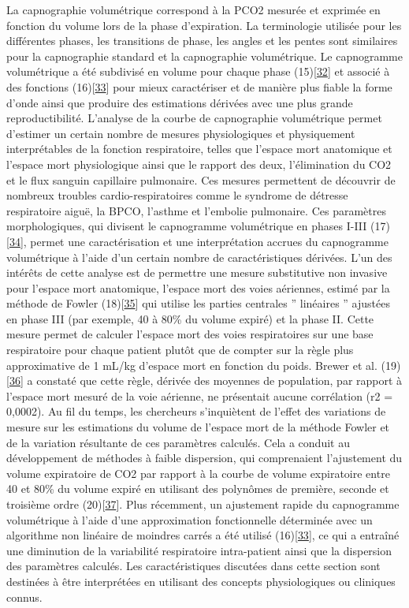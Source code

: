 \documentclass[12pt,]{article}
\begin{document}
La capnographie volumétrique correspond à la PCO2 mesurée et exprimée en
fonction du volume lors de la phase d'expiration. La terminologie
utilisée pour les différentes phases, les transitions de phase, les
angles et les pentes sont similaires pour la capnographie standard et la
capnographie volumétrique. Le capnogramme volumétrique a été subdivisé
en volume pour chaque phase
(15){[}\protect\hyperlink{ref-rayburn1994neural}{32}{]} et associé à des
fonctions (16){[}\protect\hyperlink{ref-tusman2011capnography}{33}{]}
pour mieux caractériser et de manière plus fiable la forme d'onde ainsi
que produire des estimations dérivées avec une plus grande
reproductibilité. L'analyse de la courbe de capnographie volumétrique
permet d'estimer un certain nombre de mesures physiologiques et
physiquement interprétables de la fonction respiratoire, telles que
l'espace mort anatomique et l'espace mort physiologique ainsi que le
rapport des deux, l'élimination du CO2 et le flux sanguin capillaire
pulmonaire. Ces mesures permettent de découvrir de nombreux troubles
cardio-respiratoires comme le syndrome de détresse respiratoire aiguë,
la BPCO, l'asthme et l'embolie pulmonaire. Ces paramètres
morphologiques, qui divisent le capnogramme volumétrique en phases I-III
(17){[}\protect\hyperlink{ref-fletcher1981concept}{34}{]}, permet une
caractérisation et une interprétation accrues du capnogramme
volumétrique à l'aide d'un certain nombre de caractéristiques dérivées.
L'un des intérêts de cette analyse est de permettre une mesure
substitutive non invasive pour l'espace mort anatomique, l'espace mort
des voies aériennes, estimé par la méthode de Fowler
(18){[}\protect\hyperlink{ref-fowler1948lung}{35}{]} qui utilise les
parties centrales '' linéaires '' ajustées en phase III (par exemple, 40
à 80\% du volume expiré) et la phase II. Cette mesure permet de calculer
l'espace mort des voies respiratoires sur une base respiratoire pour
chaque patient plutôt que de compter sur la règle plus approximative de
1 mL/kg d'espace mort en fonction du poids. Brewer et al.
(19){[}\protect\hyperlink{ref-brewer2008anatomic}{36}{]} a constaté que
cette règle, dérivée des moyennes de population, par rapport à l'espace
mort mesuré de la voie aérienne, ne présentait aucune corrélation (r2 =
0,0002). Au fil du temps, les chercheurs s'inquiètent de l'effet des
variations de mesure sur les estimations du volume de l'espace mort de
la méthode Fowler et de la variation résultante de ces paramètres
calculés. Cela a conduit au développement de méthodes à faible
dispersion, qui comprenaient l'ajustement du volume expiratoire de CO2
par rapport à la courbe de volume expiratoire entre 40 et 80\% du volume
expiré en utilisant des polynômes de première, seconde et troisième
ordre (20){[}\protect\hyperlink{ref-tang2007systematic}{37}{]}. Plus
récemment, un ajustement rapide du capnogramme volumétrique à l'aide
d'une approximation fonctionnelle déterminée avec un algorithme non
linéaire de moindres carrés a été utilisé
(16){[}\protect\hyperlink{ref-tusman2011capnography}{33}{]}, ce qui a
entraîné une diminution de la variabilité respiratoire intra-patient
ainsi que la dispersion des paramètres calculés. Les caractéristiques
discutées dans cette section sont destinées à être interprétées en
utilisant des concepts physiologiques ou cliniques connus.
\end{document}
